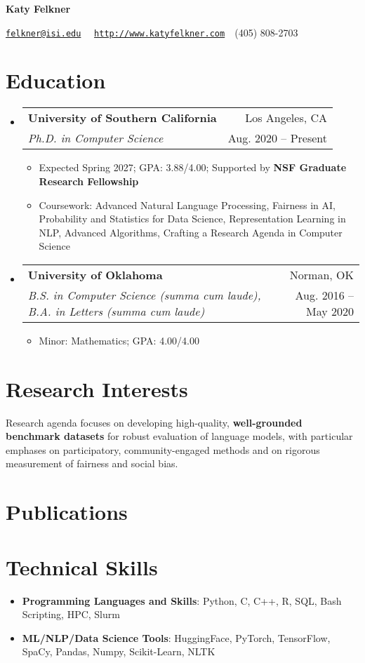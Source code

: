 \documentclass[letterpaper,11pt]{article}
\makeatletter
\newcommand{\resumeItemWithHeader}[2]{
  \item\small{
    \textbf{#1}{: #2 \vspace{-2pt}}
  }
}
\newcommand{\resumeItem}[1]{
  \item\small{
  {#1 \vspace{-2pt}}
  }
}
\newcommand{\resumeSubheading}[4]{
  \vspace{-1pt} \item
    \begin{tabular*}{0.97\textwidth}{l@{\extracolsep{\fill}}r}
      \textbf{#1} & #2 \\
      \textit{\small#3} & \small #4 \\
      
    \end{tabular*}\vspace{-5pt}
}
\newcommand{\resumeSubHeadingListStart}{\begin{itemize}[label={}, leftmargin=*]}
\newcommand{\resumeSubHeadingListEnd}{\end{itemize}}
\newcommand{\resumeItemListStart}{\begin{itemize}}
\newcommand{\resumeItemListEnd}{\end{itemize}\vspace{-5pt}}
\makeatother
\begin{document}
\textbf{\LARGE Katy Felkner}

\href{mailto:felkner@isi.edu}{\texttt{felkner@isi.edu}}~\textbar~ \href{http://katyfelkner.com/}{\texttt{http://www.katyfelkner.com}}~\textbar~(405) 808-2703


\section{Education}
  \resumeSubHeadingListStart
    \resumeSubheading
      {University of Southern California}{Los Angeles, CA}
      {Ph.D. in Computer Science}{Aug. 2020 -- Present}
      \resumeItemListStart
        \resumeItem{Expected Spring 2027; GPA: 3.88/4.00; Supported by \textbf{NSF Graduate Research Fellowship}}
      \resumeItem{Coursework: Advanced Natural Language Processing, Fairness in AI, Probability and Statistics for Data Science, Representation Learning in NLP, Advanced Algorithms, Crafting a Research Agenda in Computer Science}
      \resumeItemListEnd
      
    \resumeSubheading
      {University of Oklahoma}{Norman, OK}
      {B.S. in Computer Science \textit{(summa cum laude)}, B.A. in Letters \textit{(summa cum laude)}}{Aug. 2016 -- May 2020}
      \resumeItemListStart
        \resumeItem{Minor: Mathematics; GPA: 4.00/4.00} 
      \resumeItemListEnd
  \resumeSubHeadingListEnd

\section{Research Interests}
\small{Research agenda focuses on developing high-quality, \textbf{well-grounded benchmark datasets} for robust evaluation of language models, with particular emphases on participatory, community-engaged methods and on rigorous measurement of fairness and social bias.}

\section{Publications}
\begin{refsection}
\nocite{*}
\printbibliography[heading=none]
\end{refsection}

\section{Technical Skills}
 \resumeSubHeadingListStart
   \resumeItemWithHeader{Programming Languages and Skills}{Python, C, C++, R, SQL, Bash Scripting, HPC, Slurm}
   \resumeItemWithHeader{ML/NLP/Data Science Tools}{HuggingFace, PyTorch, TensorFlow, SpaCy, Pandas, Numpy, Scikit-Learn, NLTK}
 \resumeSubHeadingListEnd
\end{document}
